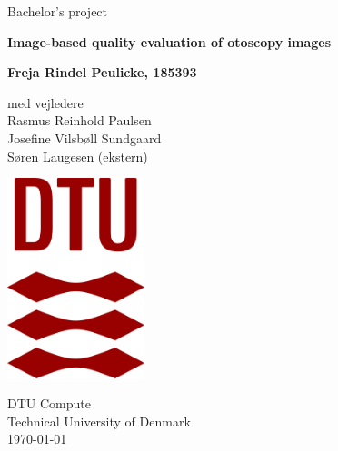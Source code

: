 \begin{titlepage}
    \begin{center}
        \vspace*{1cm}
            
        \LARGE
        Bachelor's project
        \vspace{0.5cm}
        
        \huge
        \textbf{Image-based quality evaluation of otoscopy images}
            
        \vspace{1.5cm}
        
        \large    
        \textbf{Freja Rindel Peulicke, 185393}
            
        \vspace{.5cm}
            
        med vejledere\\
        Rasmus Reinhold Paulsen\\
        Josefine Vilsbøll Sundgaard\\
        Søren Laugesen (ekstern)

        \vspace{0.8cm}
            
        \includegraphics[width=0.3\textwidth]{Figures/DTU_Logo_Corporate_Red_RGB.png}

        \vspace{0.8cm}

        \Large
        DTU Compute\\
        Technical University of Denmark\\
        \today


    \end{center}
\end{titlepage}